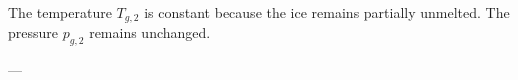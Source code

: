 The temperature \( T_{g,2} \) is constant because the ice remains partially unmelted.  
The pressure \( p_{g,2} \) remains unchanged.  

---